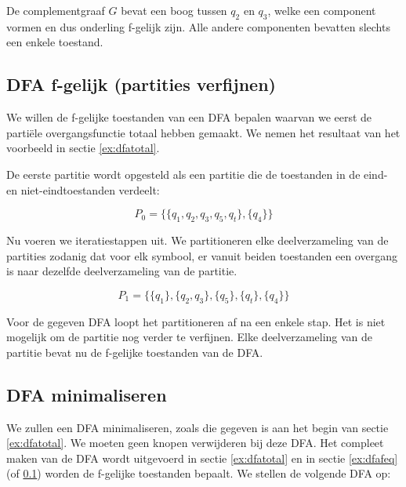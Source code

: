 De complementgraaf $G$ bevat een boog tussen $q_2$ en $q_3$, welke een component vormen en dus onderling f-gelijk zijn. Alle andere componenten bevatten slechts een enkele toestand.

\subsection{DFA f-gelijk (partities verfijnen)}
\label{ex:dfafeqpart}

We willen de f-gelijke toestanden van een DFA bepalen waarvan we eerst de parti\"ele overgangsfunctie totaal hebben gemaakt. We nemen het resultaat van het voorbeeld in sectie \ref{ex:dfatotal}.

De eerste partitie wordt opgesteld als een partitie die de toestanden in de eind- en niet-eindtoestanden verdeelt:

\begin{equation*}
P_0 = \{\{q_1,q_2,q_3,q_5,q_t\},\{q_4\}\}
\end{equation*}

Nu voeren we iteratiestappen uit. We partitioneren elke deelverzameling van de partities zodanig dat voor elk symbool, er vanuit beiden toestanden een overgang is naar dezelfde deelverzameling van de partitie.

\begin{equation*}
P_1 = \{\{q_1\},\{q_2,q_3\},\{q_5\},\{q_t\},\{q_4\}\}
\end{equation*}

Voor de gegeven DFA loopt het partitioneren af na een enkele stap. Het is niet mogelijk om de partitie nog verder te verfijnen. Elke deelverzameling van de partitie bevat nu de f-gelijke toestanden van de DFA.

\subsection{DFA minimaliseren}
\label{ex:dfamin}

We zullen een DFA minimaliseren, zoals die gegeven is aan het begin van sectie \ref{ex:dfatotal}. We moeten geen knopen verwijderen bij deze DFA. Het compleet maken van de DFA wordt uitgevoerd in sectie \ref{ex:dfatotal} en in sectie \ref{ex:dfafeq} (of \ref{ex:dfafeqpart}) worden de f-gelijke toestanden bepaalt. We stellen de volgende DFA op:

